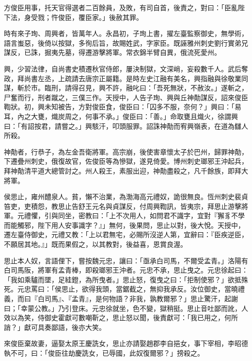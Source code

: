 \begin{pinyinscope}
 方俊臣用事，托天官得選者二百餘員，及敗，有司自首，後責之，對曰：「臣亂陛下法，身受戮；忤俊臣，覆臣家。」後赦其罪。



 時有來子珣、周興者，皆萬年人。永昌初，子珣上書，擢左臺監察御史，無學術，語言蚩惡，後倚以按獄，多徇后旨，故賜姓武，字家臣。既誣雅州刺史劉行實弟兄謀反，已誅，掘夷先墓，得遷游擊將軍。常衣錦半臂自異，俄流死愛州。



 興，少習法律，自尚書史積遷秋官侍郎，屢決制獄，文深峭，妄殺數千人。武后奪政，拜尚書左丞，上疏請去唐宗正屬籍。是時左史江融有美名，興指融與徐敬業同謀，斬於市。臨刑，請得召見，興不許，融叱曰：「吾死無狀，不赦汝。」遂斬之，尸奮而行，刑者蹴之，三僕三作。天授中，人告子珣、興與丘神勣謀反，詔來俊臣鞫狀。初，興未知被告，方對俊臣食，俊臣曰：「囚多不服，奈何？」興曰：「易耳，內之大甕，熾炭周之，何事不承。」俊臣曰：「善。」命取甕且熾火，徐謂興曰：「有詔按君，請嘗之。」興駭汗，叩頭服罪。詔誅神勣而宥興嶺表，在道為讎人所殺。



 神勣者，行恭子，為左金吾衛將軍。高宗崩，後使害章懷太子於巴州，歸罪神勣，下遷疊州刺史，俄復故官，佐俊臣等為慘獄，遂見倚愛。博州刺史瑯邪王沖起兵，拜神勣清平道大總管討之。州人殺王，素服出迎，神勣盡殺之，凡千餘族，即拜大將軍。



 侯思止，雍州醴泉人。貧，懶不治業，為渤海高元禮奴，詭很無良。恆州刺史裴貞笞吏，吏積怨，教思止告舒王元名與貞謀反，付周興鞫訊，皆夷宗，拜思止游擊將軍。元禮懼，引與同坐，密教曰：「上不次用人，如問君不識字，宜對『獬豸不學而能觸邪，陛下用人安事識字？』」無何，後果問，思止以對，後大悅。天授中，遷左臺侍御史，元禮又教：「上以君無宅，必賜所沒逆人第，宜辭曰：『臣疾逆臣，不願居其地。』」既而果假之，以其教對，後益喜，恩賞良渥。



 思止本人奴，言語俚下，嘗按魏元忠，讓曰：「亟承白司馬，不爾受孟青。」洛陽有白司馬阪，將軍有孟青棒，即殺瑯邪王沖者。元忠不承，思止曳之。元忠徐起曰：「我如乘驢而墜，足絓鐙，為所曳者。」思止怒，復曳之曰：「拒制使邪？」欲抵殊死。元忠罵曰：「侯思止，欲得我頭，當鋸截之，無抑我承反。汝位御史，當曉禮義，而曰『白司馬』、『孟青』，是何物語？非我，孰教爾邪？」思止驚汗，起謝曰；「幸蒙公教。」乃引登床。元忠徐就坐，色不變，獄稍挺。思止音吐鄙而訛，人效以為笑，侍御史霍獻可數嘲靳之，思止怒以聞，後責獻可：「我已用之，何所誚？」獻可具奏鄙語，後亦大笑。



 來俊臣棄故妻，逼娶太原王慶詵女，思止亦請娶趙郡李自挹女，事下宰相，李昭德執不可，曰：「俊臣往劫慶詵女，已辱國，此奴復爾邪？」搒殺之。




\end{pinyinscope}
